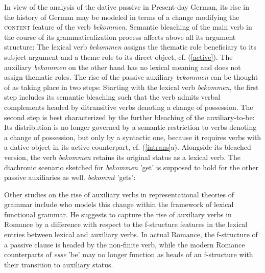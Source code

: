 \documentclass[output=paper]{langsci/langscibook}
\begin{document}
In view of the analysis of the dative passive in Present-day German, its rise in the history of German may be modeled in terms of a change modifying the \textsc{content} feature of the verb \textit{bekommen}. Semantic bleaching of the main verb in the course of its grammaticalization process affects above all its argument structure: The lexical verb \textit{bekommen} assigns the thematic role beneficiary to its subject argument and a theme role to its direct object, cf. (\ref{active}). The auxiliary \textit{bekommen} on the other hand has no lexical meaning and does not assign thematic roles. The rise of the passive auxiliary \textit{bekommen} can be thought of as taking place in two steps:
Starting with the lexical verb \textit{bekommen}, the first step includes its semantic bleaching such that the verb admits verbal complements headed by ditransitive verbs denoting a change of possession. The second step is best characterized by the further bleaching of the auxiliary-to-be: Its distribution is no longer governed by a semantic restriction to verbs denoting a change of possession, but only by a syntactic one, because it requires verbs with a dative object in its active counterpart, cf. (\ref{intrans}a). Alongside its bleached version, the verb \textit{bekommen} retains its original status as a lexical verb. The diachronic scenario sketched for \textit{bekommen} 'get' is supposed to hold for the other passive auxiliaries as well. 
\ea \label{active} 
\textit{bekommt} 'gets': \\
\z 

Other studies on the rise of auxiliary verbs in representational theories of grammar include \cite{schwarze2001} who models this change within the framework of lexical functional grammar. He suggests to capture the rise of auxiliary verbs in Romance by a difference with respect to the f-structure features in the lexical entries between lexical and auxiliary verbs. In actual Romance, the f-structure of a passive clause is headed by the non-finite verb, while the modern Romance counterparts of  \textit{esse} 'be' may no longer function as heads of an f-structure with their transition to auxiliary status.
\end{document}
